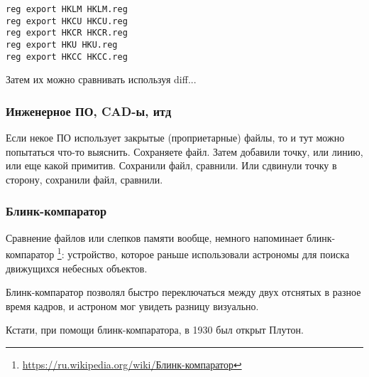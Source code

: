 \begin{lstlisting}
reg export HKLM HKLM.reg
reg export HKCU HKCU.reg
reg export HKCR HKCR.reg
reg export HKU HKU.reg
reg export HKCC HKCC.reg
\end{lstlisting}

Затем их можно сравнивать используя diff...

\subsubsection{Инженерное ПО, CAD-ы, итд}

Если некое ПО использует закрытые (проприетарные) файлы, то и тут можно попытаться что-то выяснить.
Сохраняете файл.
Затем добавили точку, или линию, или еще какой примитив.
Сохранили файл, сравнили.
Или сдвинули точку в сторону, сохранили файл, сравнили.

\subsubsection{Блинк-компаратор}

Сравнение файлов или слепков памяти вообще, немного напоминает блинк-компаратор
\footnote{\url{https://ru.wikipedia.org/wiki/Блинк-компаратор}}:
устройство, которое раньше использовали астрономы для поиска движущихся небесных объектов.

Блинк-компаратор позволял быстро переключаться между двух отснятых в разное время кадров,
и астроном мог увидеть разницу визуально.

Кстати, при помощи блинк-компаратора, в 1930 был открыт Плутон.

